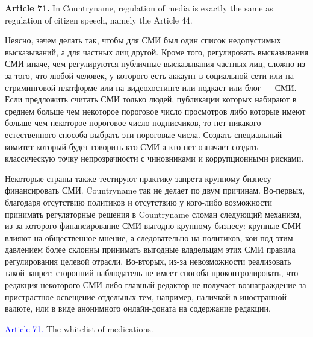 \documentclass[11pt]{article}
\theoremstyle{remark}
\theoremstyle{definition}
\begin{document}
\textbf{Article 71.} In Countryname, regulation of media is exactly the same as regulation of citizen speech, namely the Article 44.


\color{blue}



Неясно, зачем делать так, чтобы для СМИ был один список недопустимых высказываний, а для частных лиц другой. Кроме того, регулировать высказывания СМИ иначе, чем регулируются публичные высказывания частных лиц, сложно из-за того, что любой человек, у которого есть аккаунт в социальной сети или на стриминговой платформе или на видеохостинге или подкаст или блог --- СМИ. Если предложить считать СМИ только людей, публикации которых набирают в среднем больше чем некоторое пороговое число просмотров либо которые имеют больше чем некоторое пороговое число подписчиков, то нет никакого естественного способа выбрать эти пороговые числа. Создать специальный комитет который будет говорить кто СМИ а кто нет означает создать классическую точку непрозрачности с чиновниками и коррупционными рисками.

Некоторые страны также тестируют практику запрета крупному бизнесу финансировать СМИ. Countryname так не делает по двум причинам. Во-первых, благодаря отсутствию политиков и отсутствию у кого-либо возможности принимать регуляторные решения в Countryname сломан следующий механизм, из-за которого финансирование СМИ выгодно крупному бизнесу: крупные СМИ влияют на общественное мнение, а следовательно на политиков, кои под этим давлением более склонны принимать выгодные владельцам этих СМИ правила регулирования целевой отрасли. Во-вторых, из-за невозможности реализовать такой запрет: сторонний наблюдатель не имеет способа проконтролировать, что редакция некоторого СМИ либо главный редактор не получает вознаграждение за пристрастное освещение отдельных тем, например, наличкой в иностранной валюте, или в виде анонимного онлайн-доната на содержание редакции. 






\color{black}









\textcolor{blue}{Article 71.} The whitelist of medications.

\end{document}

